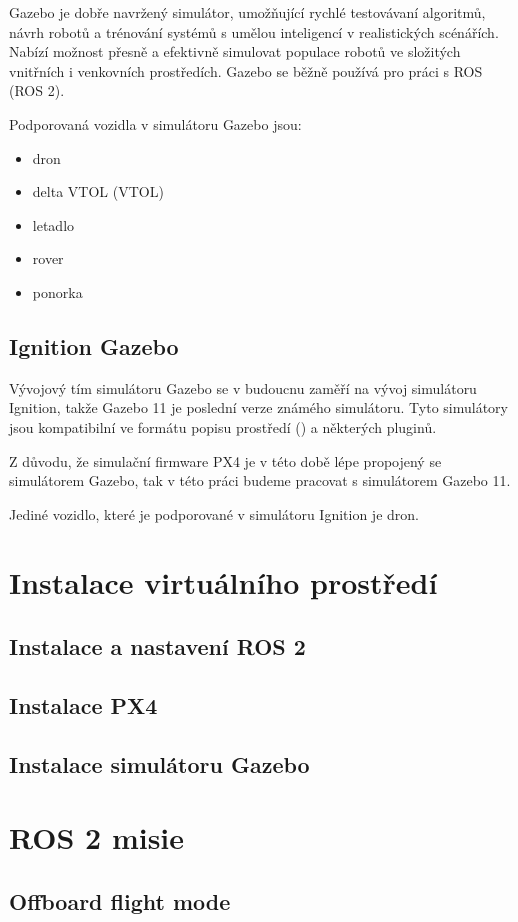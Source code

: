 Gazebo je dobře navržený simulátor, umožňující rychlé testovávaní algoritmů, návrh robotů a trénování systémů s umělou inteligencí v realistických scénářích. Nabízí možnost přesně a efektivně simulovat populace robotů ve složitých vnitřních i venkovních prostředích. Gazebo se běžně používá pro práci s ROS (ROS 2). \cite{GAZ}

Podporovaná vozidla v simulátoru Gazebo jsou:

\begin{itemize}
    \item dron
    \item delta \acs{VTOL} (\acl{VTOL})
    \item letadlo
    \item rover
    \item ponorka
\end{itemize}

\subsection{Ignition Gazebo}

Vývojový tím simulátoru Gazebo se v budoucnu zaměří na vývoj simulátoru Ignition, takže Gazebo 11 je poslední verze známého simulátoru. Tyto simulátory jsou kompatibilní ve formátu popisu prostředí () a některých pluginů. \cite{IGN}

Z důvodu, že simulační firmware PX4 je v této době lépe propojený se simulátorem Gazebo, tak v této práci budeme pracovat s simulátorem Gazebo 11.

Jediné vozidlo, které je podporované v simulátoru Ignition je dron.

\section{Instalace virtuálního prostředí}

\subsection{Instalace a nastavení ROS 2}

\subsection{Instalace PX4}

\subsection{Instalace simulátoru Gazebo}

\section{ROS 2 misie}

\subsection{Offboard flight mode}
